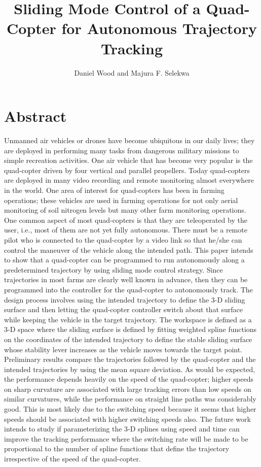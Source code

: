 \documentclass[12pt, letterpaper]{article}
\begin{document}
\title{Sliding Mode Control of a Quad-Copter for Autonomous Trajectory Tracking}
\author{Daniel Wood and Majura F. Selekwa}
\maketitle
\section*{Abstract} Unmanned air vehicles or drones have become ubiquitous in our daily lives; they are deployed in performing many tasks from dangerous military missions to simple recreation activities. One air vehicle that has become very popular is the quad-copter driven by four vertical and parallel propellers. Today quad-copters are deployed in many video recording and remote monitoring almost everywhere in the world. One area of interest for quad-copters has been in farming operations; these vehicles are used in farming operations for not only aerial monitoring of soil nitrogen levels but many other farm monitoring operations. One common aspect of most quad-copters is that they are teleoperated by the user, i.e., most of them are not yet fully autonomous. There must be a remote pilot who is connected to the quad-copter by a video link so that he/she can control the maneuver of the vehicle along the intended path. This paper intends to show that a quad-copter can be programmed to run autonomously along a predetermined trajectory by using sliding mode control strategy. Since trajectories in most farms are clearly well known in advance, then they can be programmed into the controller for the quad-copter to autonomously track. The design process involves using the intended trajectory to define the 3-D sliding surface and then letting the quad-copter controller switch about that surface while keeping the vehicle in the target trajectory. The workspace is defined as a 3-D space where the sliding surface is defined by fitting weighted spline functions on the coordinates of the intended trajectory to define the stable sliding surface whose stability lever increases as the vehicle moves towards the target point. Preliminary results compare the trajectories followed by the quad-copter and the intended trajectories by using the mean square deviation. As would be expected, the performance depends heavily on the speed of the quad-copter; higher speeds on sharp curvature are associated with large tracking errors than low speeds on similar curvatures, while the performance on straight line paths was considerably good. This is  most likely due to the switching speed because it seems that higher speeds should be associated with higher switching speeds also. The future work intends to study if parameterizing the 3-D splines using speed and time can improve the tracking performance where the switching rate will be made to be proportional to the number of spline functions that define the trajectory irrespective of the speed of the quad-copter.
\end{document}
